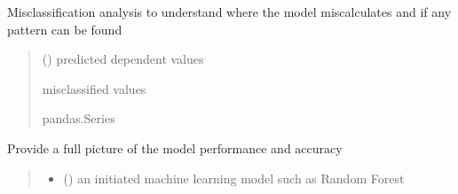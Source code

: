 \documentclass[letterpaper,10pt,english]{sphinxmanual}
\begin{document}
\begin{fulllineitems}

\begin{fulllineitems}
\label{\detokenize{BeeClassification:BeeClassification.BeeClassification.misclassified_analysis}}
\pysigstartsignatures
{}
\pysigstopsignatures
\sphinxAtStartPar
Misclassification analysis to understand where the model miscalculates and if any pattern can be found
\begin{quote}\begin{description}
\sphinxAtStartPar
{} () \textendash{} predicted dependent values

\sphinxAtStartPar
misclassified values

\sphinxAtStartPar
pandas.Series

\end{description}\end{quote}

\end{fulllineitems}


\begin{fulllineitems}
\label{\detokenize{BeeClassification:BeeClassification.BeeClassification.model_results}}
\pysigstartsignatures
{}
\pysigstopsignatures
\sphinxAtStartPar
Provide a full picture of the model performance and accuracy
\begin{quote}\begin{description}
\begin{itemize}
\item {} 
\sphinxAtStartPar
{} () \textendash{} an initiated machine learning model such as Random Forest


\end{itemize}
\end{description}
\end{quote}
\end{fulllineitems}
\end{fulllineitems}
\end{document}
